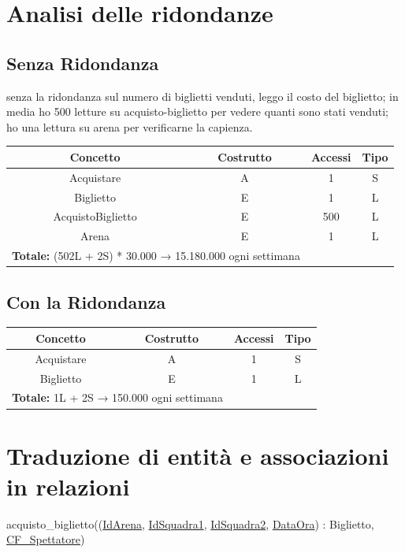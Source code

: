 \documentclass[a4paper,12pt]{report}
\begin{document}
\section{Analisi delle ridondanze}
\subsection*{Senza Ridondanza}
senza la ridondanza sul numero di biglietti venduti, leggo il costo del biglietto; in media ho 500 letture su acquisto-biglietto per vedere quanti sono stati venduti; ho una lettura su arena per verificarne la capienza.
\begin{center}
	\begin{tabular}{|c|c|c|c|}
		\hline\rowcolor{pink}
		Concetto & Costrutto & Accessi & Tipo\\
		\hline\hline		
		Acquistare & A & 1 & S\\
		Biglietto & E & 1 & L\\
		AcquistoBiglietto & E & 500 & L\\
		Arena & E & 1 & L\\
		\hline
		\hline
		\multicolumn{2}{l}{%
			\textbf{Totale:} (502L + 2S) * 30.000 → 15.180.000 ogni settimana} \\
		\hline
	\end{tabular}
\end{center}
\subsection*{Con la Ridondanza}
\begin{center}
	\begin{tabular}{|c|c|c|c|}
		\hline\rowcolor{pink}
		Concetto & Costrutto & Accessi & Tipo\\
		\hline\hline		
		Acquistare & A & 1 & S\\
		Biglietto & E & 1 & L\\		
		\hline
		\hline
		\multicolumn{2}{l}{%
			\textbf{Totale:} 1L + 2S → 150.000 ogni settimana} \\
		\hline
	\end{tabular}
\end{center}
\section{Traduzione di entità e associazioni in relazioni}

acquisto\_biglietto((\underline{IdArena}, \underline{IdSquadra1}, \underline{IdSquadra2}, \underline{DataOra}) : Biglietto, \underline{CF\_Spettatore}) \\
\end{document}
